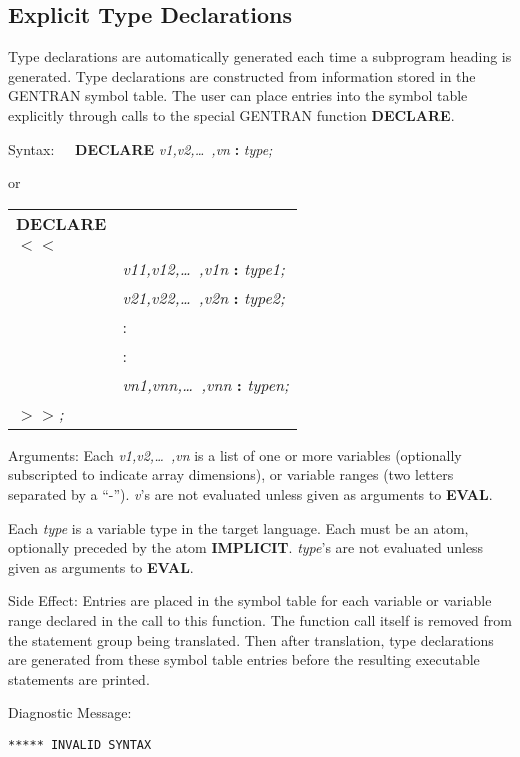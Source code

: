 \subsection{Explicit Type Declarations}
\label{explicit:type}
Type declarations are automatically generated each time a subprogram
heading is generated.  Type declarations are constructed
from information stored in the GENTRAN symbol table.  The user
can place entries into the symbol table explicitly through calls
to the special GENTRAN function {\bf DECLARE}. 
\begin{describe}{Syntax:}
{\bf \ \ DECLARE} {\it v1,v2,\dots\  ,vn} {\bf :} {\it type;}

    or

\begin{tabular}{ll}
{\bf DECLARE}\\
{\bf $<$$<$}\\ 
&{\it v11,v12,\dots\  ,v1n} {\bf :} {\it type1;}\\
&{\it v21,v22,\dots\  ,v2n} {\bf :} {\it type2;}\\
& :\\
& :\\
&{\it vn1,vnn,\dots\  ,vnn} {\bf :} {\it typen;}\\ 
{\bf $>$$>$}{\it ;}
\end{tabular}
\end{describe}
\begin{describe}{Arguments:}
Each {\it v1,v2,\dots\  ,vn} is a list of one or more variables
(optionally subscripted to indicate array dimensions), or
variable ranges (two letters separated by a ``-'').  {\it v}'s are
not evaluated unless given as arguments to {\bf EVAL}.

Each {\it type} is a variable type in the target language.  Each
must be an atom, optionally preceded by the atom {\bf IMPLICIT}.
{\it type}'s are not evaluated unless given as arguments to {\bf EVAL}.
\end{describe}
\begin{describe}{Side Effect:}
Entries are placed in the symbol table for each variable or
variable range declared in the call to this function.  The function
call itself is removed from the statement group being
translated.  Then after translation, type declarations are
generated from these symbol table entries before the resulting
executable statements are printed.
\end{describe}
\begin{describe}{Diagnostic Message:}
\begin{verbatim}
***** INVALID SYNTAX
\end{verbatim}
\end{describe}
